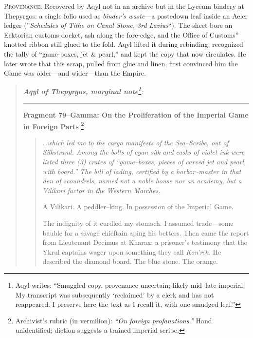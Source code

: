 \documentclass[11pt]{article}
\begin{document}
\medskip
\noindent\small\textsc{Provenance.} Recovered by Aqyl not in an archive but in the Lyceum bindery at Thepyrgos: a single folio used as \emph{binder's waste}---a pastedown leaf inside an Aeler ledger (''\emph{Schedules of Tithe on Canal Stone, 3rd Lavius}``). The sheet bore an Ecktorian customs docket, ash along the fore-edge, and the Office of Customs'' knotted ribbon still glued to the fold. Aqyl lifted it during rebinding, recognized the tally of ``game-boxes, jet \& pearl,'' and kept the copy that now circulates. He later wrote that this scrap, pulled from glue and linen, first convinced him the Game was older---and wider---than the Empire. \normalsize
\medskip

\begin{quote}\small\itshape
\textbf{Aqyl of Thepyrgos, marginal note}\footnote{Aqyl writes: ``Smuggled copy, provenance uncertain; likely mid--late imperial. My transcript was subsequently `reclaimed' by a clerk and has not reappeared. I preserve here the text as I recall it, with one smudged leaf.''}:

\medskip
\upshape\noindent\rule{0.82\linewidth}{0.4pt}\par
\itshape

\textbf{Fragment 79--Gamma: On the Proliferation of the Imperial Game in Foreign Parts}%
\footnote{Archivist's rubric (in vermilion): \emph{``On foreign profanations.''} Hand unidentified; diction suggests a trained imperial scribe.}
\label{frag:79gamma}

\begin{quote}\small\itshape
\noindent
\ldots which led me to the cargo manifests of the \emph{Sea--Scribe}, out of Silkstrand. Among the bolts of cyan silk and casks of violet ink were listed three (3) crates of ``game--boxes, pieces of carved jet and pearl, with board.'' The bill of lading, certified by a harbor--master in that den of scoundrels, named not a noble house nor an academy, but a \emph{Vilikari factor} in the Western Marches.

\smallskip
\noindent
A Vilikari. A peddler--king. In possession of the Imperial Game.

\smallskip
\noindent
The indignity of it curdled my stomach. I assumed trade---some bauble for a savage chieftain aping his betters. Then came the report from Lieutenant Decimus at Kharax: a prisoner's testimony that the Ykrul captains wager upon something they call \emph{Kon'reh}. He described the diamond board. The blue stone. The orange.


\end{quote}
\end{quote}
\end{document}
